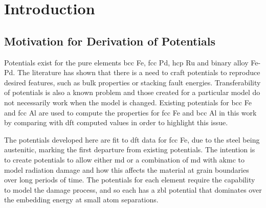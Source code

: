 \begin{changemargin}{1.0cm}{1.0cm}
\end{changemargin}



\section{Introduction}

\subsection{Motivation for Derivation of Potentials}

Potentials exist for the pure elements \acrshort{bcc} \Gls{Fe}, \acrshort{fcc} \Gls{Pd}, \acrshort{hcp} \Gls{Ru} and binary alloy \Gls{Fe}-\Gls{Pd}.  The literature has shown that there is a need to craft potentials to reproduce desired features, such as bulk properties\cite{shengeamonline} or stacking fault energies\cite{mendelevruau}.  Transferability of potentials is also a known problem\cite{transferability} and those created for a particular model do not necessarily work when the model is changed.  Existing potentials for \acrshort{bcc} \Gls{Fe} and \acrshort{fcc} \Gls{Al} are used to compute the properties for \acrshort{fcc} \Gls{Fe} and \acrshort{bcc} \Gls{Al} in this work by comparing with \acrshort{dft} computed values in order to highlight this issue.

The potentials developed here are fit to \acrshort{dft} data for \acrshort{fcc} \Gls{Fe}, due to the steel being austenitic, marking the first departure from existing potentials.  The intention is to create potentials to allow either \acrshort{md} or a combination of \acrshort{md} with \acrshort{akmc} to model radiation damage and how this affects the material at grain boundaries over long periods of time.  The potentials for each element require the capability to model the damage process, and so each has a \acrshort{zbl} potential that dominates over the embedding energy at small atom separations.

